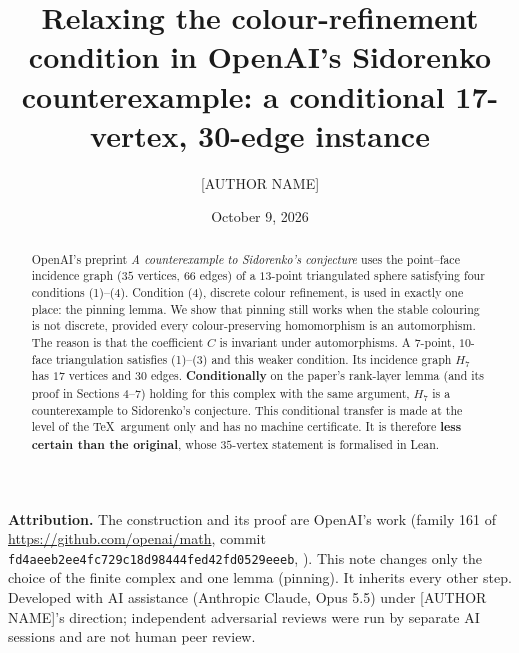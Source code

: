 \documentclass[11pt]{amsart}
\title[A 17-vertex candidate in the Sidorenko construction]{Relaxing the colour-refinement condition in OpenAI's Sidorenko counterexample: a conditional 17-vertex, 30-edge instance}
\author{[AUTHOR NAME]}
\date{October 9, 2026}
\theoremstyle{definition}
\theoremstyle{remark}
\newcommand{\1}{\mathbf 1}
\begin{document}
\begin{abstract}
OpenAI's preprint \emph{A counterexample to Sidorenko's conjecture} uses the point--face incidence graph
($35$ vertices, $66$ edges) of a $13$-point triangulated sphere satisfying four conditions (1)--(4).
Condition (4), discrete colour refinement, is used in exactly one place: the pinning lemma. We show
that pinning still works when the stable colouring is not discrete, provided every colour-preserving
homomorphism is an automorphism. The reason is that the coefficient $C$ is invariant under
automorphisms. A $7$-point, $10$-face triangulation satisfies (1)--(3) and this weaker condition. Its
incidence graph $H_7$ has $17$ vertices and $30$ edges. \textbf{Conditionally} on the paper's rank-layer
lemma (and its proof in Sections 4--7) holding for this complex with the same argument, $H_7$ is a
counterexample to Sidorenko's conjecture. This conditional transfer is made at the level of the
\TeX\ argument only and has no machine certificate. It is therefore \textbf{less certain than the
original}, whose $35$-vertex statement is formalised in Lean.
\end{abstract}
\maketitle

\noindent\textbf{Attribution.} The construction and its proof are OpenAI's work (family 161 of
\url{https://github.com/openai/math}, commit \nolinkurl{fd4aeeb2ee4fc729c18d98444fed42fd0529eeeb},
\cite{oai}). This note changes only the choice of the finite complex and one lemma (pinning). It
inherits every other step. Developed with AI assistance (Anthropic Claude, Opus 5.5) under
[AUTHOR NAME]'s direction; independent adversarial reviews were run by separate AI sessions and are not
human peer review.

\medskip
\noindent{}
\end{document}
